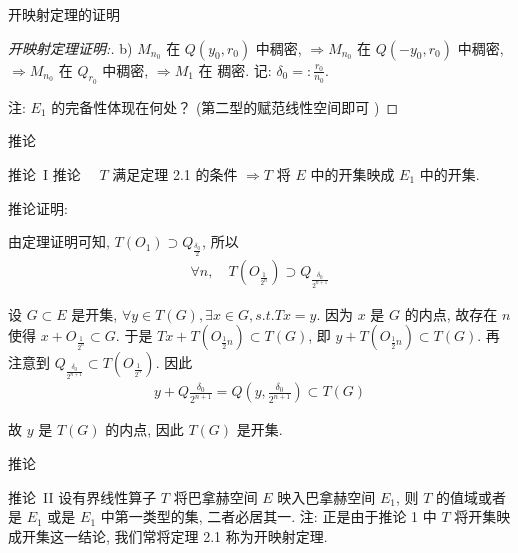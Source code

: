 \documentclass[sans,mathserif]{beamer} %
\begin{document}
\begin{frame}{开映射定理的证明}
	\begin{proof}[开映射定理证明:]

b)  $M_{n_{0}}$  在  $Q\left(y_{0}, r_{0}\right)$  中稠密,  $\Rightarrow M_{n_{0}}$  在  $Q\left(-y_{0}, r_{0}\right)$  中稠密,
 $\Rightarrow M_{n_{0}}$  在  $Q_{r_{0}}$  中稠密,
 $\Rightarrow M_{1}$  在
稠密.
记:   $\delta_{0}=: \frac{r_{0}}{n_{0}}$.

注:  $E_{1}$  的完备性体现在何处？ (第二型的赋范线性空间即可  )

	\end{proof}
	\end{frame}

\begin{frame}{推论}
	\begin{alertblock}{推论~I}
		推论~~ $T$  满足定理 2.1 的条件 $\Rightarrow  T $ 将 $ E $ 中的开集映成 $ E_{1}$  中的开集.

推论证明:
{\footnotesize
 由定理证明可知, $T\left(O_{1}\right) \supset Q_{\frac{\delta_{0}}{2}}$, 所以
\begin{align*}
	\forall n, \quad T\left(O_{\frac{1}{2^{n}}}\right) \supset Q_{\frac{\delta_{0}}{2^{n+1}}}
\end{align*}

设  $G \subset E$  是开集,  $\forall y \in T(G), \exists x \in G,  s.t.  T x=y $.
因为  $x$  是 $G$ 的内点, 故存在  $n$  使得  $x+O_{\frac{1}{2^{n}}} \subset G $.
于是  $T x+T\left(O_{\frac{1}{2} n}\right) \subset T(G)$,  即  $y+T\left(O_{\frac{1}{2} n}\right) \subset T(G) $.
再注意到 $ Q_{\frac{\delta_{0}}{2^{n+1}}} \subset T\left(O_{\frac{1}{2^{n}}}\right) $.  因此
\begin{align*}
	y+Q \frac{\delta_{0}}{2^{n+1}}=Q\left(y, \frac{\delta_{0}}{2^{n+1}}\right) \subset T(G)
\end{align*}

故  $y $ 是 $ T(G) $ 的内点, 因此 $ T(G) $ 是开集.
}
	\end{alertblock}
	\end{frame}

	\begin{frame}{推论}
		\begin{alertblock}{推论~II}
			设有界线性算子 $ T $ 将巴拿赫空间 $ E $ 映入巴拿赫空间 $ E_{1}$,  则 $ T $ 的值域或者是 $ E_{1} $ 或是 $ E_{1} $ 中第一类型的集, 二者必居其一.
注: 正是由于推论 1 中 $ T $ 将开集映成开集这一结论, 我们常将定理 2.1 称为开映射定理.
		\end{alertblock}
		\end{frame}
\end{document}
